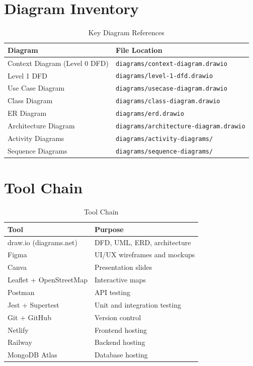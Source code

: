 
\section{Diagram Inventory}
\begin{table}[H]
\centering
\caption{Key Diagram References}
\label{tab:diagrams}
\begin{tabularx}{\textwidth}{@{}lX@{}}
\toprule
Diagram & File Location \\
\midrule
Context Diagram (Level 0 DFD) & \texttt{diagrams/context-diagram.drawio} \\
Level 1 DFD & \texttt{diagrams/level-1-dfd.drawio} \\
Use Case Diagram & \texttt{diagrams/usecase-diagram.drawio} \\
Class Diagram & \texttt{diagrams/class-diagram.drawio} \\
ER Diagram & \texttt{diagrams/erd.drawio} \\
Architecture Diagram & \texttt{diagrams/architecture-diagram.drawio} \\
Activity Diagrams & \texttt{diagrams/activity-diagrams/} \\
Sequence Diagrams & \texttt{diagrams/sequence-diagrams/} \\
\bottomrule
\end{tabularx}
\end{table}

\section{Tool Chain}
\begin{table}[H]
\centering
\caption{Tool Chain}
\label{tab:tools}
\begin{tabularx}{\textwidth}{@{}lX@{}}
\toprule
Tool & Purpose \\
\midrule
draw.io (diagrams.net) & DFD, UML, ERD, architecture \\
Figma & UI/UX wireframes and mockups \\
Canva & Presentation slides \\
Leaflet + OpenStreetMap & Interactive maps \\
Postman & API testing \\
Jest + Supertest & Unit and integration testing \\
Git + GitHub & Version control \\
Netlify & Frontend hosting \\
Railway & Backend hosting \\
MongoDB Atlas & Database hosting \\
\bottomrule
\end{tabularx}
\end{table}
